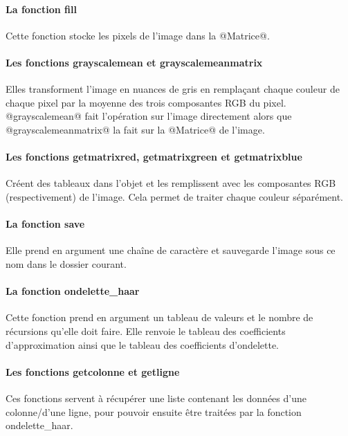 \documentclass{article}
\begin{document}
\paragraph{La fonction fill}

Cette fonction stocke les pixels de l'image dans la @Matrice@.

\paragraph{Les fonctions grayscalemean et grayscalemeanmatrix}

Elles transforment l'image en nuances de gris en remplaçant chaque couleur de chaque pixel par la moyenne des trois composantes RGB du pixel.
@grayscalemean@ fait l'opération sur l'image directement alors que @grayscalemeanmatrix@ la fait sur la @Matrice@ de l'image.

\paragraph{Les fonctions getmatrixred, getmatrixgreen et getmatrixblue}

Créent des tableaux dans l'objet et les remplissent avec les composantes RGB (respectivement) de l'image. Cela permet de traiter chaque couleur séparément.

\paragraph{La fonction save}

Elle prend en argument une chaîne de caractère et sauvegarde l'image sous ce nom dans le dossier courant.

\paragraph{La fonction ondelette\_{}haar}

Cette fonction prend en argument un tableau de valeurs et le nombre de récursions qu'elle doit faire. Elle renvoie le tableau des coefficients d'approximation ainsi que le tableau des coefficients d'ondelette.

\paragraph{Les fonctions getcolonne et getligne}

Ces fonctions servent à récupérer une liste contenant les données d'une colonne/d'une ligne, pour pouvoir ensuite être traitées par la fonction ondelette\_{}haar.
\end{document}
